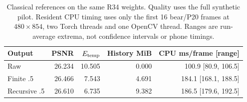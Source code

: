 \begin{table}[t]
\centering\small
\caption{Classical references on the same R34 weights. Quality uses the full synthetic pilot. Resident CPU timing uses only the first 16 bear/P20 frames at $480\times854$, two Torch threads and one OpenCV thread. Ranges are run-average extrema, not confidence intervals or phone timings.}
\label{tab:classical}
\begin{tabular}{lrrrr}
\toprule
Output & PSNR & $E_{\rm temp}$ & History MiB & CPU ms/frame [range]\\
\midrule
Raw & 26.234 & 10.505 & 0.000 & 100.9 [80.9, 106.5]\\
Finite .5 & 26.466 & 7.543 & 4.691 & 184.1 [168.1, 188.5]\\
Recursive .5 & 26.610 & 6.735 & 9.382 & 186.5 [179.6, 192.5]\\
\bottomrule
\end{tabular}
\end{table}
